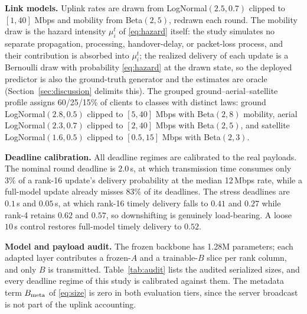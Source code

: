 \documentclass[a4paper,fleqn]{cas-dc}
\begin{document}
\textbf{Link models.} Uplink rates are drawn from LogNormal$(2.5,0.7)$ clipped to $[1,40]$ Mbps and mobility from Beta$(2,5)$, redrawn each round. The mobility draw is the hazard intensity $\mu_i^t$ of \eqref{eq:hazard} itself: the study simulates no separate propagation, processing, handover-delay, or packet-loss process, and their contribution is absorbed into $\mu_i^t$; the realized delivery of each update is a Bernoulli draw with probability \eqref{eq:hazard} at the drawn state, so the deployed predictor is also the ground-truth generator and the estimates are oracle (Section~\ref{sec:discussion} delimits this). The grouped ground--aerial--satellite profile assigns 60/25/15\% of clients to classes with distinct laws: ground LogNormal$(2.8,0.5)$ clipped to $[5,40]$ Mbps with Beta$(2,8)$ mobility, aerial LogNormal$(2.3,0.7)$ clipped to $[2,40]$ Mbps with Beta$(2,5)$, and satellite LogNormal$(1.6,0.5)$ clipped to $[0.5,15]$ Mbps with Beta$(2,3)$.

\textbf{Deadline calibration.} All deadline regimes are calibrated to the real payloads. The nominal round deadline is $2.0$\,s, at which transmission time consumes only $3\%$ of a rank-16 update's delivery probability at the median 12\,Mbps rate, while a full-model update already misses $83\%$ of its deadlines. The stress deadlines are $0.1$\,s and $0.05$\,s, at which rank-16 timely delivery falls to $0.41$ and $0.27$ while rank-4 retains $0.62$ and $0.57$, so downshifting is genuinely load-bearing. A loose $10$\,s control restores full-model timely delivery to $0.52$.

\textbf{Model and payload audit.} The frozen backbone has 1.28M parameters; each adapted layer contributes a frozen-$A$ and a trainable-$B$ slice per rank column, and only $B$ is transmitted. Table~\ref{tab:audit} lists the audited serialized sizes, and every deadline regime of this study is calibrated against them. The metadata term $B_{\rm meta}$ of \eqref{eq:size} is zero in both evaluation tiers, since the server broadcast is not part of the uplink accounting.

\begin{table}[pos=tbp]
\centering
\caption{Payload audit of real serialized update sizes. Frozen-$A$ clients upload only the trainable $B$ factor (1{,}408 parameters per rank column); the $A{+}B$ column is the joint-training equivalent. The stylized $s(r)$ column lists the protocol reused as a normalized-cost cell in Section~\ref{sec:simsim}.}
\label{tab:audit}
\end{table}
\end{document}
